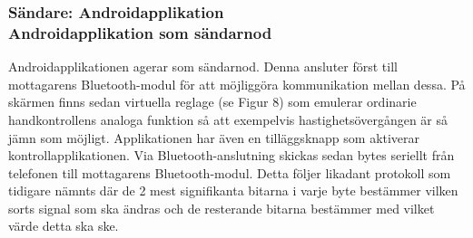\documentclass[a4paper]{article}
\begin{document}
\subsubsection{Sändare: Androidapplikation \\ Androidapplikation som sändarnod}
Androidapplikationen agerar som sändarnod. Denna ansluter först till mottagarens Bluetooth-modul för att möjliggöra kommunikation mellan dessa. På skärmen finns sedan virtuella reglage (se Figur 8) som emulerar ordinarie handkontrollens analoga funktion så att exempelvis hastighetsövergången är så jämn som möjligt. Applikationen har även en tilläggsknapp som aktiverar kontrollapplikationen. Via Bluetooth-anslutning skickas sedan bytes seriellt från telefonen till mottagarens Bluetooth-modul. Detta följer likadant protokoll som tidigare nämnts där de 2 mest signifikanta bitarna i varje byte bestämmer vilken sorts signal som ska ändras och de resterande bitarna bestämmer med vilket värde detta ska ske. 


\end{document}

